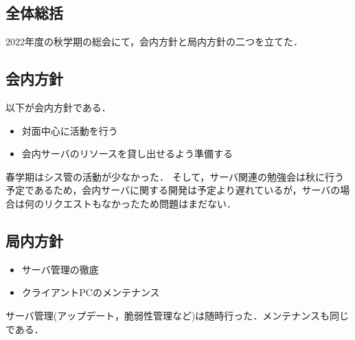 \subsection*{全体総括}


2022年度の秋学期の総会にて，会内方針と局内方針の二つを立てた．

\subsection*{会内方針}
以下が会内方針である．
    \begin{itemize}
        \item 対面中心に活動を行う
        \item 会内サーバのリソースを貸し出せるよう準備する
    \end{itemize}
春学期はシス管の活動が少なかった．
そして，サーバ関連の勉強会は秋に行う予定であるため，会内サーバに関する開発は予定より遅れているが，サーバの場合は何のリクエストもなかったため問題はまだない．

\subsection*{局内方針}
    \begin{itemize}
        \item サーバ管理の徹底
        \item クライアントPCのメンテナンス
    \end{itemize}
サーバ管理(アップデート，脆弱性管理など)は随時行った．メンテナンスも同じである．
